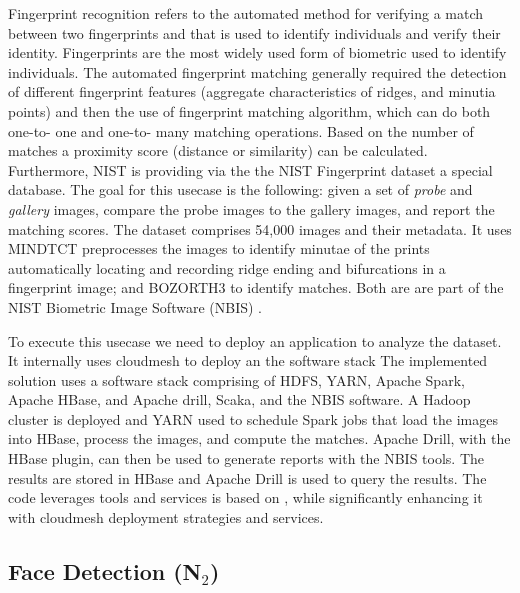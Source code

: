 Fingerprint recognition refers to the automated method for verifying a
match between two fingerprints and that is used to identify
individuals and verify their identity. Fingerprints are the most
widely used form of biometric used to identify individuals. The
automated fingerprint matching generally required the detection of
different fingerprint features (aggregate characteristics of ridges,
and minutia points) and then the use of fingerprint matching
algorithm, which can do both one-to- one and one-to- many matching
operations. Based on the number of matches a proximity score (distance
or similarity) can be calculated. Furthermore, NIST is providing via
the the NIST Fingerprint dataset a special database. The goal for this
usecase is the following: given a set of {\it probe} and {\it gallery}
images, compare the probe images to the gallery images, and report the
matching scores.  The dataset comprises 54,000 images and their
metadata.  It uses MINDTCT \cite{mindtct} preprocesses the images
to identify minutae of the prints automatically locating and recording
ridge ending and bifurcations in a fingerprint image; and BOZORTH3
\cite{garris2001user} to identify matches. Both are are part of the NIST
Biometric Image Software (NBIS) \cite{watson2007user}.

To execute this usecase we need to deploy an application to analyze
the dataset. It internally uses cloudmesh to deploy an the software
stack The implemented \cite{nist-fingerprint}
solution uses a software stack comprising of HDFS, YARN, Apache Spark,
Apache HBase, and Apache drill, Scaka, and the NBIS software. A Hadoop
cluster is deployed and YARN used to schedule Spark jobs that load the
images into HBase, process the images, and compute the matches. Apache
Drill, with the HBase plugin, can then be used to generate reports
with the NBIS tools\cite{watson2007user}. The results are stored in HBase and
Apache Drill \cite{??} is used to query the results.  The code
leverages tools and services is based on \cite{nist-bd-pwg}   , while significantly
enhancing it with cloudmesh deployment strategies and services.

\cite{flanagan2010nist}

\subsection{Face Detection (N$_2$)}


